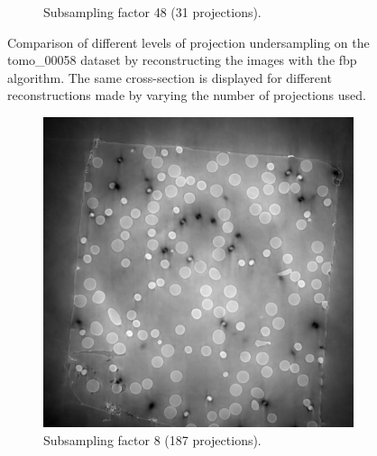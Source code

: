 \begin{figure}
\begin{subfigure}[t]{.45\textwidth}
    \caption{Subsampling factor 48 (31 projections). }
  \end{subfigure}
  \caption[Four different levels of projection undersampling]{Comparison of different levels of projection undersampling on the tomo\_00058 dataset by reconstructing the images with the \gls{fbp} algorithm. The same cross-section is displayed for different reconstructions made by varying the number of projections used.  }
  \label{fig:tomo00058missingwedgecomparison}
\end{figure}


\begin{figure}
  \begin{subfigure}[t]{.45\textwidth}
    \centering
    \includegraphics[width=\linewidth]{figures/ns8it100000itd4mse035logcosh3.png}
    \caption{Subsampling factor 8 (187 projections). }
  \end{subfigure}
  \hfill
  \begin{subfigure}[t]{.45\textwidth}
    \centering

\end{subfigure}
\end{figure}
